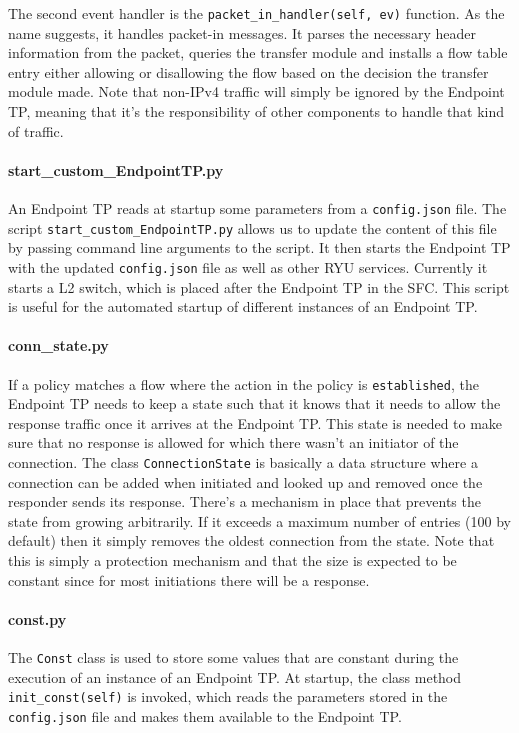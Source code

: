 The second event handler is the \texttt{packet\_in\_handler(self, ev)} function. As the name suggests, it handles packet-in messages. It parses the necessary header information from the packet, queries the transfer module and installs a flow table entry either allowing or disallowing the flow based on the decision the transfer module made. Note that non-\acs{IP}v4 traffic will simply be ignored by the Endpoint \acs{TP}, meaning that it's the responsibility of other components to handle that kind of traffic.

\paragraph{start\_custom\_EndpointTP.py} An Endpoint \acs{TP} reads at startup some parameters from a \texttt{config.json} file. The script \texttt{start\_custom\_EndpointTP.py} allows us to update the content of this file by passing command line arguments to the script. It then starts the Endpoint \acs{TP} with the updated \texttt{config.json} file as well as other RYU services. Currently it starts a L2 switch, which is placed after the Endpoint \acs{TP} in the \acs{SFC}. This script is useful for the automated startup of different instances of an Endpoint \acs{TP}.

\paragraph{conn\_state.py} If a policy matches a flow where the action in the policy is \texttt{established}, the Endpoint \acs{TP} needs to keep a state such that it knows that it needs to allow the response traffic once it arrives at the Endpoint \acs{TP}. This state is needed to make sure that no response is allowed for which there wasn't an initiator of the connection. The class \texttt{ConnectionState} is basically a data structure where a connection can be added when initiated and looked up and removed once the responder sends its response. There's a mechanism in place that prevents the state from growing arbitrarily. If it exceeds a maximum number of entries (100 by default) then it simply removes the oldest connection from the state. Note that this is simply a protection mechanism and that the size is expected to be constant since for most initiations there will be a response.

\paragraph{const.py} The \texttt{Const} class is used to store some values that are constant during the execution of an instance of an Endpoint \acs{TP}. At startup, the class method \texttt{init\_const(self)} is invoked, which reads the parameters stored in the \texttt{config.json} file and makes them available to the Endpoint \acs{TP}.

